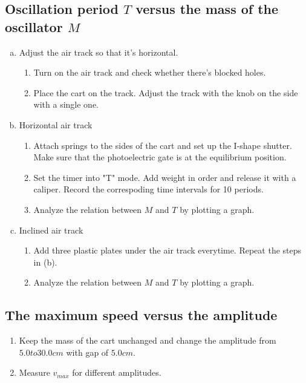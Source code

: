\subsection{Oscillation period $T$ versus the mass of the oscillator $M$}
    \begin{enumerate}[(a)]
        \item Adjust the air track so that it's horizontal.
            \begin{enumerate}[1.]
                \item Turn on the air track and check whether there's blocked holes.
                \item Place the cart on the track. Adjust the track with the knob on the side with a single one.
            \end{enumerate}
        \item Horizontal air track
            \begin{enumerate}[1.]
                \item Attach springs to the sides of the cart and set up the I-shape shutter. Make sure that the photoelectric gate is at the equilibrium position.
                \item Set the timer into "T" mode. Add weight in order and release it with a caliper. Record the correspoding time intervals for 10 periods.
                \item Analyze the relation between $M$ and $T$ by plotting a graph.
            \end{enumerate}
        \item Inclined air track
            \begin{enumerate}[1.]
                \item Add three plastic plates under the air track everytime. Repeat the steps in (b).
                \item Analyze the relation between $M$ and $T$ by plotting a graph.
            \end{enumerate}
    \end{enumerate}
    
\subsection{The maximum speed versus the amplitude}
    \begin{enumerate}
        \item Keep the mass of the cart unchanged and change the amplitude from $5.0 to 30.0 cm$ with gap of $5.0cm$.
        \item Measure $v_{max}$ for different amplitudes.
    \end{enumerate}

